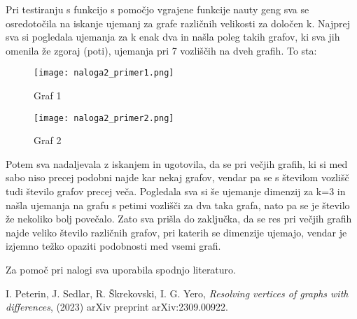 \documentclass[12pt,a4paper]{amsart}
\theoremstyle{plain} %
\begin{document}
Pri testiranju s funkcijo s pomočjo vgrajene funkcije nauty geng sva se osredotočila na iskanje ujemanj za grafe različnih velikosti za določen k. Najprej sva si pogledala ujemanja za k enak dva in našla poleg takih grafov, ki sva jih omenila že zgoraj (poti), ujemanja pri 7 vozliščih na dveh grafih. To sta:

\bigskip

\begin{figure}
    \begin{minipage}{0.5\textwidth}
      \centering
      \texttt{[image: naloga2\_primer1.png]}
      \caption{Graf 1}
      \label{fig:slika1}
    \end{minipage}%
    \begin{minipage}{0.5\textwidth}
      \centering
      \texttt{[image: naloga2\_primer2.png]}
      \caption{Graf 2}
      \label{fig:slika2}
    \end{minipage}
  \end{figure}

\bigskip
Potem sva nadaljevala z iskanjem in ugotovila, da se pri večjih grafih, ki si med sabo niso precej podobni najde kar nekaj grafov, vendar pa se s številom vozlišč tudi število grafov precej veča. 
Pogledala sva si še ujemanje dimenzij za k=3 in našla ujemanja na grafu s petimi vozlišči za dva taka grafa, nato pa se je število že nekoliko bolj povečalo. Zato sva prišla do zaključka, da se res pri večjih grafih najde veliko število različnih grafov, pri katerih se dimenzije ujemajo, vendar je izjemno težko opaziti podobnosti med vsemi grafi. 

\bigskip





\bigskip
Za pomoč pri nalogi sva uporabila spodnjo literaturo.
\begin{thebibliography}{99}
    I. Peterin, J. Sedlar, R. Škrekovski, I. G. Yero,
    \emph{Resolving vertices of graphs with differences},
    (2023) arXiv preprint arXiv:2309.00922.
    \end{thebibliography}
\end{document}

